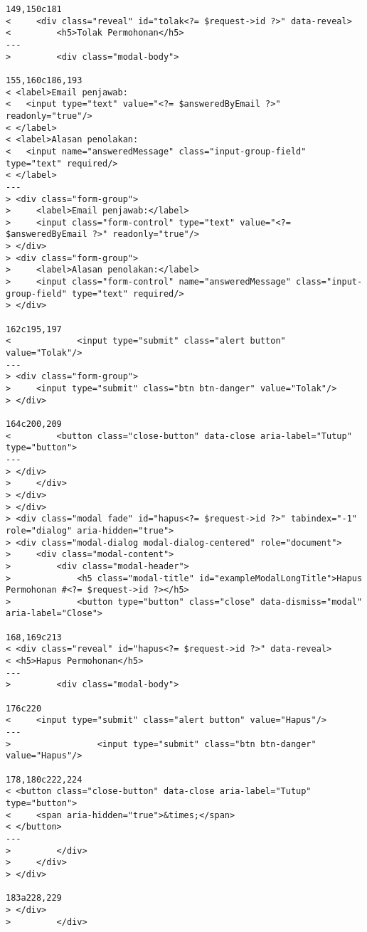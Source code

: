 \begin{lstlisting}
149,150c181
<     <div class="reveal" id="tolak<?= $request->id ?>" data-reveal>
<         <h5>Tolak Permohonan</h5>
---
>         <div class="modal-body">

155,160c186,193
< <label>Email penjawab:
< 	<input type="text" value="<?= $answeredByEmail ?>" readonly="true"/>
< </label>
< <label>Alasan penolakan:
< 	<input name="answeredMessage" class="input-group-field" type="text" required/>
< </label>
---
> <div class="form-group">
>     <label>Email penjawab:</label>
>     <input class="form-control" type="text" value="<?= $answeredByEmail ?>" readonly="true"/>
> </div>
> <div class="form-group">
>     <label>Alasan penolakan:</label>
>     <input class="form-control" name="answeredMessage" class="input-group-field" type="text" required/>
> </div>

162c195,197
<             <input type="submit" class="alert button" value="Tolak"/>
---
> <div class="form-group">
>     <input type="submit" class="btn btn-danger" value="Tolak"/>
> </div>

164c200,209
<         <button class="close-button" data-close aria-label="Tutup" type="button">
---
> </div>
>     </div>
> </div>
> </div>
> <div class="modal fade" id="hapus<?= $request->id ?>" tabindex="-1" role="dialog" aria-hidden="true">
> <div class="modal-dialog modal-dialog-centered" role="document">
>     <div class="modal-content">
>         <div class="modal-header">
>             <h5 class="modal-title" id="exampleModalLongTitle">Hapus Permohonan #<?= $request->id ?></h5>
>             <button type="button" class="close" data-dismiss="modal" aria-label="Close">

168,169c213
< <div class="reveal" id="hapus<?= $request->id ?>" data-reveal>
< <h5>Hapus Permohonan</h5>
---
>         <div class="modal-body">

176c220
<     <input type="submit" class="alert button" value="Hapus"/>
---
>                 <input type="submit" class="btn btn-danger" value="Hapus"/>

178,180c222,224
< <button class="close-button" data-close aria-label="Tutup" type="button">
<     <span aria-hidden="true">&times;</span>
< </button>
---
>         </div>
>     </div>
> </div>

183a228,229
> </div>
>         </div>
\end{lstlisting}

